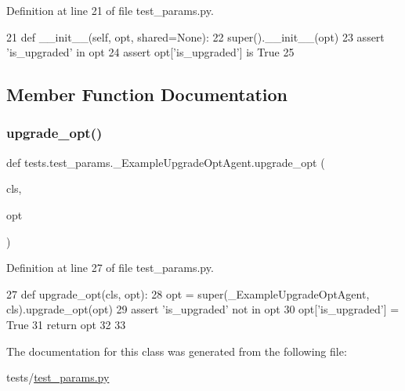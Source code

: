 Definition at line 21 of file test\+\_\+params.\+py.


\begin{DoxyCode}
21     \textcolor{keyword}{def }\_\_init\_\_(self, opt, shared=None):
22         super().\_\_init\_\_(opt)
23         \textcolor{keyword}{assert} \textcolor{stringliteral}{'is\_upgraded'} \textcolor{keywordflow}{in} opt
24         \textcolor{keyword}{assert} opt[\textcolor{stringliteral}{'is\_upgraded'}] \textcolor{keywordflow}{is} \textcolor{keyword}{True}
25 
\end{DoxyCode}


\subsection{Member Function Documentation}
\mbox{\label{classtests_1_1test__params_1_1__ExampleUpgradeOptAgent_ad842b65ef0ce493c7644622aae6e17dc}} 
\subsubsection{\texorpdfstring{upgrade\+\_\+opt()}{upgrade\_opt()}}
{\footnotesize\ttfamily def tests.\+test\+\_\+params.\+\_\+\+Example\+Upgrade\+Opt\+Agent.\+upgrade\+\_\+opt (\begin{DoxyParamCaption}\item[{}]{cls,  }\item[{}]{opt }\end{DoxyParamCaption})}



Definition at line 27 of file test\+\_\+params.\+py.


\begin{DoxyCode}
27     \textcolor{keyword}{def }upgrade\_opt(cls, opt):
28         opt = super(\_ExampleUpgradeOptAgent, cls).upgrade\_opt(opt)
29         \textcolor{keyword}{assert} \textcolor{stringliteral}{'is\_upgraded'} \textcolor{keywordflow}{not} \textcolor{keywordflow}{in} opt
30         opt[\textcolor{stringliteral}{'is\_upgraded'}] = \textcolor{keyword}{True}
31         \textcolor{keywordflow}{return} opt
32 
33 
\end{DoxyCode}


The documentation for this class was generated from the following file\+:\begin{DoxyCompactItemize}
\item 
tests/\hyperlink{test__params_8py}{test\+\_\+params.\+py}\end{DoxyCompactItemize}
